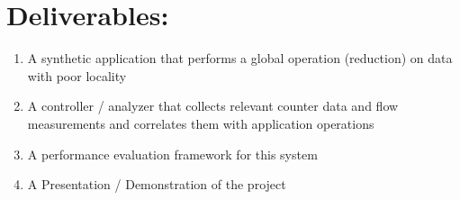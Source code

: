 \documentclass[12pt]{article}
\begin{document}
\section*{Deliverables:}
\label{deriverables}
\begin{enumerate}
\item A synthetic application that performs a global operation (reduction) on data with poor locality
\item A controller / analyzer that collects relevant counter data and flow measurements and correlates them with application operations
\item A performance evaluation framework for this system
\item A Presentation / Demonstration of the project
\end{enumerate}



%
%
\end{document}

